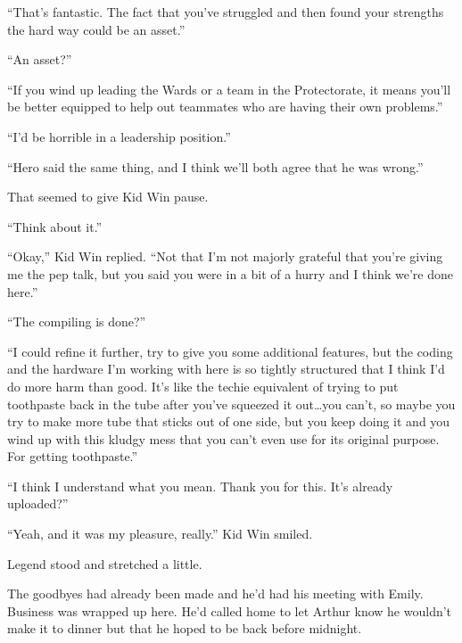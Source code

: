 ``That's fantastic.  The fact that you've struggled and then found your strengths the hard way could be an asset.''



``An asset?''



``If you wind up leading the Wards or a team in the Protectorate, it means you'll be better equipped to help out teammates who are having their own problems.''



``I'd be horrible in a leadership position.''



``Hero said the same thing, and I think we'll both agree that he was wrong.''



That seemed to give Kid Win pause.



``Think about it.''



``Okay,'' Kid Win replied.  ``Not that I'm not majorly grateful that you're giving me the pep talk, but you said you were in a bit of a hurry and I think we're done here.''



``The compiling is done?''



``I could refine it further, try to give you some additional features, but the coding and the hardware I'm working with here is so tightly structured that I think I'd do more harm than good.  It's like the techie equivalent of trying to put toothpaste back in the tube after you've squeezed it out\ldots you can't, so maybe you try to make more tube that sticks out of one side, but you keep doing it and you wind up with this kludgy mess that you can't even use for its original purpose.  For getting toothpaste.''



``I think I understand what you mean.  Thank you for this.  It's already uploaded?''



``Yeah, and it was my pleasure, really.'' Kid Win smiled.



Legend stood and stretched a little.



The goodbyes had already been made and he'd had his meeting with Emily.  Business was wrapped up here.  He'd called home to let Arthur know he wouldn't make it to dinner but that he hoped to be back before midnight.



